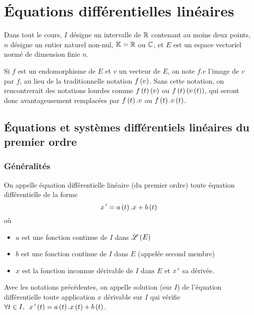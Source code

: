 \chapter{Équations différentielles linéaires}

\minitoc

Dans tout le cours, \(I\) désigne un intervalle de \(\mathbb{R}\) contenant au moins deux points, \(n\) désigne un entier naturel non-nul, \(\mathbb{K}=\mathbb{R}\) ou \(\mathbb{C}\), et \(E\) est un espace vectoriel normé de dimension finie \(n\).

Si \(f\) est un endomorphisme de \(E\) et \(v\) un vecteur de \(E\), on note \(f.v\) l'image de \(v\) par \(f\), au lieu de la traditionnelle notation \(f\left(v\right)\). Sans cette notation, on rencontrerait des notations lourdes comme \(f\left(t\right)\left(v\right)\) ou \(f\left(t\right)\left(v\left(t\right)\right)\), qui seront donc avantageusement remplacées par \(f\left(t\right).v\) ou \(f\left(t\right).v\left(t\right)\).

\section{Équations et systèmes différentiels linéaires du premier ordre}

\subsection{Généralités}

\begin{defi}
On appelle équation différentielle linéaire (du premier ordre) toute équation différentielle de la forme \[x^{\,\prime}=a\left(t\right).x+b\left(t\right)\] où

\begin{itemize}
    \item \(a\) est une fonction continue de \(I\) dans \(\mathscr{L}\left(E\right)\) \\
    \item \(b\) est une fonction continue de \(I\) dans \(E\) (appelée second membre) \\
    \item \(x\) est la fonction inconnue dérivable de \(I\) dans \(E\) et \(x^{\,\prime}\) sa dérivée.
\end{itemize}
\end{defi}

\begin{defi}
Avec les notations précédentes, on appelle solution (sur \(I\)) de l'équation différentielle toute application \(x\) dérivable sur \(I\) qui vérifie \(\quantifs{\forall t\in I}x\prim\paren{t}=a\paren{t}.x\paren{t}+b\paren{t}\).
\end{defi}


